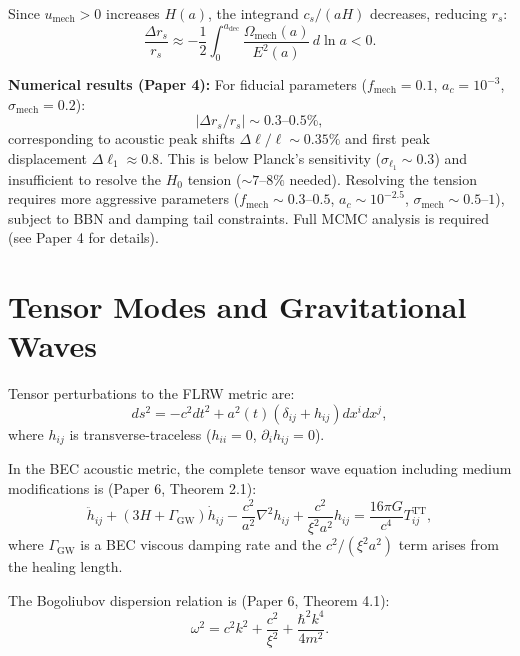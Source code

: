 \documentclass[11pt,a4paper]{article}
\newcommand{\umech}{\ensuremath{u_{\mathrm{mech}}}}
\theoremstyle{definition}
\theoremstyle{remark}
\begin{document}
Since $\umech > 0$ increases $H(a)$, the integrand $c_s/(aH)$ decreases, reducing $r_s$:
\begin{equation}
\frac{\Delta r_s}{r_s} \approx -\frac{1}{2}\int_0^{a_{\mathrm{dec}}} \frac{\Omega_{\mathrm{mech}}(a)}{E^2(a)} \, d\ln a < 0.
\end{equation}

\textbf{Numerical results (Paper 4):} For fiducial parameters ($f_{\mathrm{mech}} = 0.1$, $a_c = 10^{-3}$, $\sigma_{\mathrm{mech}} = 0.2$):
\begin{equation}
|\Delta r_s/r_s| \sim 0.3\text{--}0.5\%,
\end{equation}
corresponding to acoustic peak shifts $\Delta\ell/\ell \sim 0.35\%$ and first peak displacement $\Delta\ell_1 \approx 0.8$. This is below Planck's sensitivity ($\sigma_{\ell_1} \sim 0.3$) and insufficient to resolve the $H_0$ tension ($\sim 7$--$8\%$ needed). Resolving the tension requires more aggressive parameters ($f_{\mathrm{mech}} \sim 0.3$--$0.5$, $a_c \sim 10^{-2.5}$, $\sigma_{\mathrm{mech}} \sim 0.5$--$1$), subject to BBN and damping tail constraints. Full MCMC analysis is required (see Paper 4 for details).

\section{Tensor Modes and Gravitational Waves}
\label{app:tensor_modes}

Tensor perturbations to the FLRW metric are:
\begin{equation}
ds^2 = -c^2 dt^2 + a^2(t)(\delta_{ij} + h_{ij})dx^i dx^j,
\end{equation}
where $h_{ij}$ is transverse-traceless ($h_{ii} = 0$, $\partial_i h_{ij} = 0$).

In the BEC acoustic metric, the complete tensor wave equation including medium modifications is (Paper 6, Theorem 2.1):
\begin{equation}
\ddot{h}_{ij} + (3H + \Gamma_{\mathrm{GW}})\dot{h}_{ij} - \frac{c^2}{a^2}\nabla^2 h_{ij} + \frac{c^2}{\xi^2 a^2}h_{ij} = \frac{16\pi G}{c^4}T_{ij}^{\mathrm{TT}},
\end{equation}
where $\Gamma_{\mathrm{GW}}$ is a BEC viscous damping rate and the $c^2/(\xi^2 a^2)$ term arises from the healing length.

The Bogoliubov dispersion relation is (Paper 6, Theorem 4.1):
\begin{equation}
\omega^2 = c^2 k^2 + \frac{c^2}{\xi^2} + \frac{\hbar^2 k^4}{4m^2}.
\end{equation}
\end{document}
